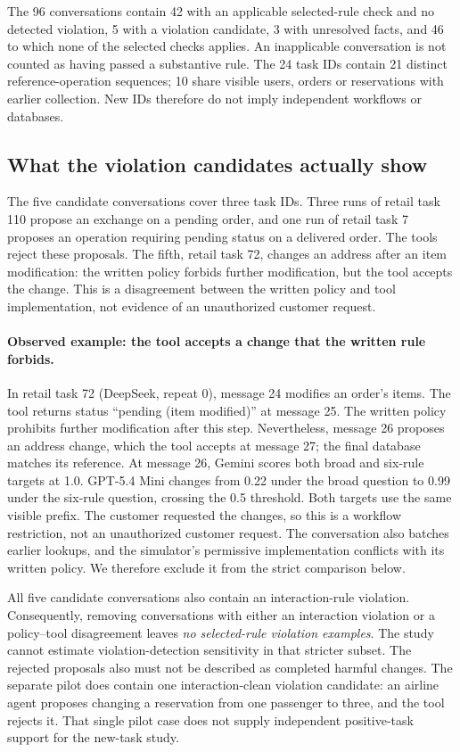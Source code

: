 The 96 conversations contain 42 with an applicable selected-rule check and no detected violation, 5 with a violation candidate, 3 with unresolved facts, and 46 to which none of the selected checks applies. An inapplicable conversation is not counted as having passed a substantive rule. The 24 task IDs contain 21 distinct reference-operation sequences; 10 share visible users, orders or reservations with earlier collection. New IDs therefore do not imply independent workflows or databases.

\subsection{What the violation candidates actually show}
The five candidate conversations cover three task IDs. Three runs of retail task 110 propose an exchange on a pending order, and one run of retail task 7 proposes an operation requiring pending status on a delivered order. The tools reject these proposals. The fifth, retail task 72, changes an address after an item modification: the written policy forbids further modification, but the tool accepts the change. This is a disagreement between the written policy and tool implementation, not evidence of an unauthorized customer request.

\paragraph{Observed example: the tool accepts a change that the written rule forbids.}
In retail task 72 (DeepSeek, repeat 0), message 24 modifies an order's items. The tool returns status ``pending (item modified)'' at message 25. The written policy prohibits further modification after this step. Nevertheless, message 26 proposes an address change, which the tool accepts at message 27; the final database matches its reference. At message 26, Gemini scores both broad and six-rule targets at 1.0. GPT-5.4 Mini changes from 0.22 under the broad question to 0.99 under the six-rule question, crossing the 0.5 threshold. Both targets use the same visible prefix. The customer requested the changes, so this is a workflow restriction, not an unauthorized customer request. The conversation also batches earlier lookups, and the simulator's permissive implementation conflicts with its written policy. We therefore exclude it from the strict comparison below.

All five candidate conversations also contain an interaction-rule violation. Consequently, removing conversations with either an interaction violation or a policy--tool disagreement leaves \emph{no selected-rule violation examples}. The study cannot estimate violation-detection sensitivity in that stricter subset. The rejected proposals also must not be described as completed harmful changes. The separate pilot does contain one interaction-clean violation candidate: an airline agent proposes changing a reservation from one passenger to three, and the tool rejects it. That single pilot case does not supply independent positive-task support for the new-task study.

